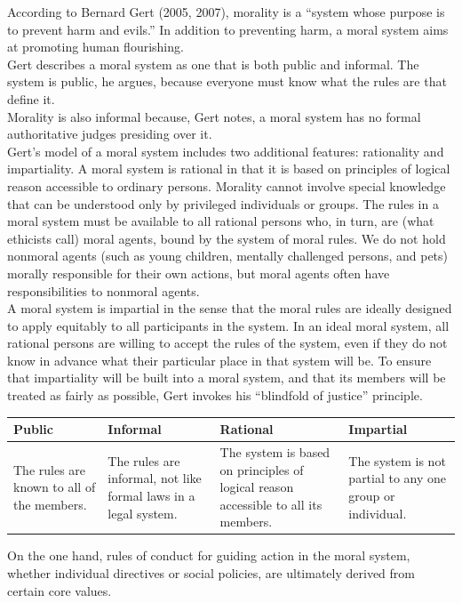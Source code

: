 \documentclass[12pt]{article}
\theoremstyle{definition}
\begin{document}
\clearpage
According to Bernard Gert (2005, 2007), morality is a “system whose purpose is to
prevent harm and evils.” In addition to preventing harm, a moral system aims at
promoting human flourishing.\\
Gert describes a moral system as one that is both public and informal. The system is
public, he argues, because everyone must know what the rules are that define it.\\
Morality is also informal because, Gert notes, a moral system has no formal
authoritative judges presiding over it.\\
Gert’s model of a moral system includes two additional features: rationality and
impartiality. A moral system is rational in that it is based on principles of logical reason
accessible to ordinary persons. Morality cannot involve special knowledge that can be
understood only by privileged individuals or groups. The rules in a moral system must be
available to all rational persons who, in turn, are (what ethicists call) moral agents, bound
by the system of moral rules. We do not hold nonmoral agents (such as young children,
mentally challenged persons, and pets) morally responsible for their own actions, but
moral agents often have responsibilities to nonmoral agents.\\
A moral system is impartial in the sense that the moral rules are ideally designed to
apply equitably to all participants in the system. In an ideal moral system, all rational
persons are willing to accept the rules of the system, even if they do not know in advance
what their particular place in that system will be. To ensure that impartiality will be
built into a moral system, and that its members will be treated as fairly as possible, Gert invokes his “blindfold of justice” principle.\\
\begin{table}[h]
\centering
\begin{tabular}{L{3cm}|L{3.5cm}|L{5.2cm}|L{3.5cm}}
\hline
Public&Informal&Rational&Impartial\\\hline
The rules are known to all of the members.&The rules are informal, not like formal laws in a legal system.&The system is based on principles of logical reason accessible to all its members.&The system is not partial to any one group or individual.\\\hline
\end{tabular}
\end{table}
On the one hand, rules of conduct for guiding action in the moral system, whether
individual directives or social policies, are ultimately derived from certain core values.
\end{document}
